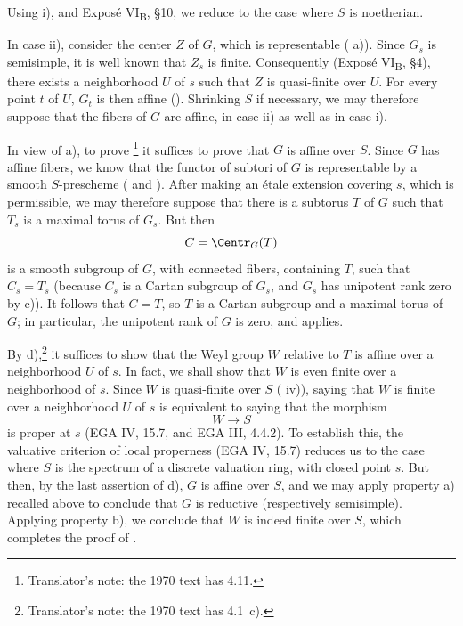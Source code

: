 Using  i), and Exposé VI\textsubscript{B}, \S10, we
reduce to the case where \(S\) is noetherian.

In case ii), consider the center \(Z\) of \(G\), which is
representable ( a)). Since \(G_s\) is semisimple,
it is well known that \(Z_s\) is finite. Consequently (Exposé
VI\textsubscript{B}, \S4), there exists a neighborhood \(U\) of
\(s\) such that \(Z\) is quasi-finite over \(U\). For every point
\(t\) of \(U\), \(G_t\) is then affine ().
Shrinking \(S\) if necessary, we may therefore suppose that the
fibers of \(G\) are affine, in case ii) as well as in case i).

In view of a), to prove \footnote{Translator's note: the 1970 text
has 4.11.} it suffices to prove that \(G\) is
affine over \(S\). Since \(G\) has affine fibers, we know that the
functor of subtori of \(G\) is representable by a smooth
\(S\)-prescheme ( and ). After making an étale
extension covering \(s\), which is permissible, we may therefore
suppose that there is a subtorus \(T\) of \(G\) such that \(T_s\)
is a maximal torus of \(G_s\). But then
\[
  C=\Centr_G(T)
\]
is a smooth subgroup of \(G\), with connected fibers, containing
\(T\), such that \(C_s=T_s\) (because \(C_s\) is a Cartan
subgroup of \(G_s\), and \(G_s\) has unipotent rank zero by c)).
It follows that \(C=T\), so \(T\) is a Cartan subgroup and a
maximal torus of \(G\); in particular, the unipotent rank of \(G\)
is zero, and  applies.

By  d),\footnote{Translator's note: the 1970 text has 4.1~c).} it
suffices to show that the Weyl group \(W\) relative
to \(T\) is affine over a neighborhood \(U\) of \(s\). In fact,
we shall show that \(W\) is even finite over a neighborhood of
\(s\). Since \(W\) is quasi-finite over \(S\) ( iv)), saying that \(W\) is finite over a neighborhood \(U\)
of \(s\) is equivalent to saying that the morphism
\[
  W\longrightarrow S
\]
is proper at \(s\) (EGA IV, 15.7, and EGA III, 4.4.2). To
establish this, the valuative criterion of local properness
(EGA IV, 15.7) reduces us to the case where \(S\) is the spectrum
of a discrete valuation ring, with closed point \(s\). But then,
by the last assertion of  d), \(G\) is affine over \(S\), and
we may apply property a) recalled above to conclude that \(G\) is
reductive (respectively semisimple). Applying property b), we
conclude that \(W\) is indeed finite over \(S\), which completes
the proof of .
